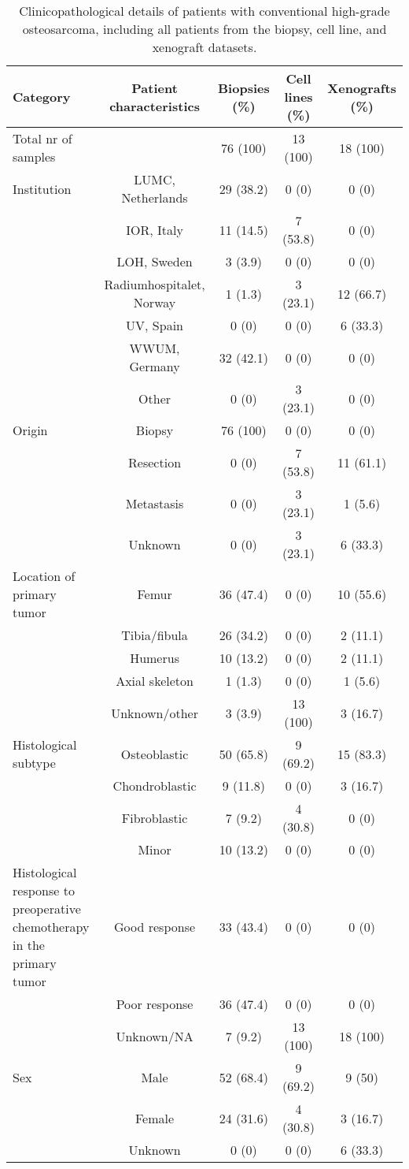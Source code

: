 \begin{landscape}
	\begin{table}[htbp]
		\centering
		\small
		\begin{tabular}[c]{|p{4.5in}cccc|} %
			\hline
			Category & Patient characteristics & Biopsies (\%) & Cell lines (\%) & Xenografts (\%)\\
			\hline
			Total nr of samples & & 76 (100) & 13 (100) & 18 (100)\\
			Institution & LUMC, Netherlands & 29 (38.2) & 0 (0) & 0 (0)\\
			& IOR, Italy & 11 (14.5) & 7 (53.8) & 0 (0)\\
			& LOH, Sweden & 3 (3.9) & 0 (0) & 0 (0)\\
			& Radiumhospitalet, Norway & 1 (1.3) & 3 (23.1) & 12 (66.7)\\
			& UV, Spain & 0 (0) & 0 (0) & 6 (33.3)\\
			& WWUM, Germany & 32 (42.1) & 0 (0) & 0 (0)\\
			& Other & 0 (0) & 3 (23.1) & 0 (0)\\
			Origin & Biopsy & 76 (100) & 0 (0) & 0 (0)\\
			& Resection & 0 (0) & 7 (53.8) & 11 (61.1)\\
			& Metastasis & 0 (0) & 3 (23.1) & 1 (5.6)\\
			& Unknown & 0 (0) & 3 (23.1) & 6 (33.3)\\
			Location of primary tumor & Femur & 36 (47.4) & 0 (0) & 10 (55.6)\\
			& Tibia/fibula & 26 (34.2) & 0 (0) & 2 (11.1)\\
			& Humerus & 10 (13.2) & 0 (0) & 2 (11.1)\\
			& Axial skeleton & 1 (1.3) & 0 (0) & 1 (5.6)\\
			& Unknown/other & 3 (3.9) & 13 (100) & 3 (16.7)\\
			Histological subtype & Osteoblastic & 50 (65.8) & 9 (69.2) & 15 (83.3)\\
			& Chondroblastic & 9 (11.8)&  0 (0) & 3 (16.7)\\
			& Fibroblastic & 7 (9.2) & 4 (30.8) & 0 (0)\\
			& Minor & 10 (13.2) & 0 (0) & 0 (0)\\
			Histological response to preoperative chemotherapy in the primary tumor & Good response & 33 (43.4) & 0 (0) & 0 (0)\\
			& Poor response & 36 (47.4) & 0 (0) & 0 (0)\\
			& Unknown/NA & 7 (9.2) & 13 (100) & 18 (100)\\
			Sex & Male & 52 (68.4) & 9 (69.2) & 9 (50)\\
			& Female & 24 (31.6) & 4 (30.8) & 3 (16.7)\\
			& Unknown & 0 (0) & 0 (0) & 6 (33.3)\\
			\hline
		\end{tabular}
		\caption{Clinicopathological details of patients with conventional high\hyp{}grade osteosarcoma, including all patients from the biopsy, cell line, and xenograft datasets.}
		\label{tab3.1}
	\end{table}
\end{landscape}
%

